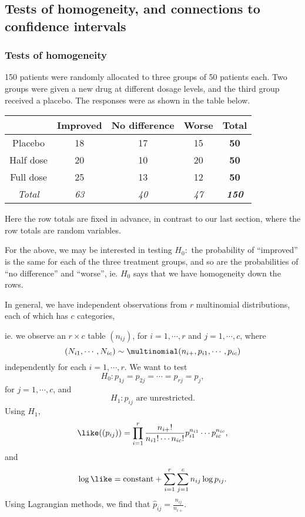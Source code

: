 \documentclass[a4paper]{article}
\begin{document}
\subsection{Tests of homogeneity, and connections to confidence intervals}
\subsubsection{Tests of homogeneity}
\begin{eg}
  150 patients were randomly allocated to three groups of 50 patients each. Two groups were given a new drug at different dosage levels, and the third group received a placebo. The responses were as shown in the table below.

  \begin{tabular}{ccccc}
    \toprule
    & Improved & No difference & Worse & \textbf{Total}\\\midrule
    Placebo & 18 & 17 & 15 & \textbf{50}\\
    Half dose & 20 & 10 & 20 & \textbf{50}\\
    Full dose & 25 & 13 & 12& \textbf{50}\\\midrule
    \textit{Total} & \textit{63} & \textit{40} & \textit{47} & \textbf{\textit{150}}\\\bottomrule
  \end{tabular}

  Here the row totals are fixed in advance, in contrast to our last section, where the row totals are random variables.

  For the above, we may be interested in testing $H_0:$ the probability of ``improved'' is the same for each of the three treatment groups, and so are the probabilities of ``no difference'' and ``worse'', ie. $H_0$ says that we have homogeneity down the rows.
\end{eg}
In general, we have independent observations from $r$ multinomial distributions, each of which has $c$ categories,

ie. we observe an $r\times c$ table $(n_{ij})$, for $i = 1, \cdots, r$ and $j = 1, \cdots, c$, where
\[
  (N_{i1}, \cdots, N_{ic}) \sim \multinomial(n_{i+}, p_{i1}, \cdots, p_{ic})
\]
independently for each $i = 1, \cdots, r$.
We want to test
\[
  H_0: p_{1j} = p_{2j} = \cdots = p_{rj} = p_j,
\]
for $j = 1, \cdots, c$,  and
\[
  H_1: p_{ij}\text{ are unrestricted}.
\]
Using $H_1$,
\[
  \like((p_{ij})) = \prod_{i = 1}^r \frac{n_{i+}!}{n_{i1}!\cdots n_{ic}!}p_{i1}^{n_{i1}} \cdots p_{ic}^{n_{ic}},
\]
and
\[
  \log\like = \text{constant} + \sum_{i = 1}^r \sum_{j = 1}^c n_{ij}\log p_{ij}.
\]
Using Lagrangian methods, we find that $\hat{p}_{ij} = \frac{n_{ij}}{n_{i+}}$.
\end{document}
